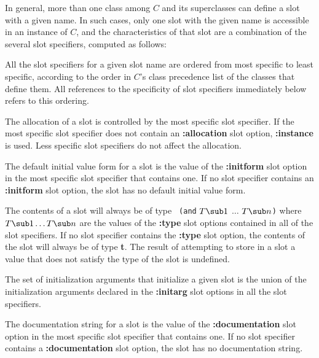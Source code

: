 In general, more than one class among $C$ and its superclasses can
define a slot with a given name.  In such cases, only one slot with
the given name is accessible in an instance of $C$\negthinspace, and
the characteristics of that slot are a combination of the several slot
specifiers, computed as follows:

\beginlist

\item{\bull} All the slot specifiers for a given slot name are ordered
from most specific to least specific, according to the order in $C$'s
class precedence list of the classes that define them. All references
to the specificity of slot specifiers immediately below refers to this
ordering.

\goodbreak

\item{\bull} The allocation of a slot is controlled by the most specific
slot specifier.  If the most specific slot specifier does not contain an
{\bf :allocation} slot option, {\bf :instance} is used.  Less specific
slot specifiers do not affect the allocation.

\item{\bull} The default initial value form for a
slot is the value of the {\bf :initform} slot option in the most
specific slot specifier that contains one.  If no slot specifier
contains an {\bf :initform} slot option, the slot has no default
initial value form.

\item{\bull} The contents of a slot will always be of type {\tt
(and} $T\sub 1$ $\ldots$ $T\sub n${\tt )} where $T\sub 1 \ldots T\sub n$ are
the values of the {\bf :type} slot options contained in all of the slot
specifiers.  If no slot specifier contains the {\bf :type} slot option, the
contents of the slot will always be of type {\bf t}. The result
of attempting to store in a slot
a value that does not satisfy the type of the slot is undefined.

\item{\bull} The set of initialization arguments that initialize a given
slot is the union of the initialization arguments declared in the {\bf
:initarg} slot options in all the slot specifiers.

\item{\bull} The documentation string for a slot is the value of the
{\bf :documentation} slot option in the most specific slot specifier
that contains one.  If no slot specifier contains a {\bf
:documentation} slot option, the slot has no documentation string.

